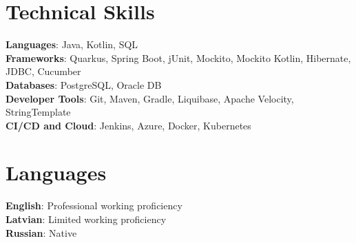 \documentclass[letterpaper,11pt]{article}
\begin{document}
\section{Technical Skills}
 \begin{itemize}[leftmargin=0.15in, label={}]
    \small{\item{
     \textbf{Languages}{: Java, Kotlin, SQL} \\
     \textbf{Frameworks}{: Quarkus, Spring Boot, jUnit, Mockito, Mockito Kotlin, Hibernate, JDBC, Cucumber} \\
     \textbf{Databases}{: PostgreSQL, Oracle DB} \\
     \textbf{Developer Tools}{: Git, Maven, Gradle, Liquibase, Apache Velocity, StringTemplate} \\
     \textbf{CI/CD and Cloud}{: Jenkins, Azure, Docker, Kubernetes}\\
    }}
 \end{itemize}
 
\section{Languages}
 \begin{itemize}[leftmargin=0.15in, label={}]
    \small{\item{
     \textbf{English}{: Professional working proficiency} \\
     \textbf{Latvian}{: Limited working proficiency} \\
     \textbf{Russian}{: Native}
    }}
 \end{itemize}
\end{document}
